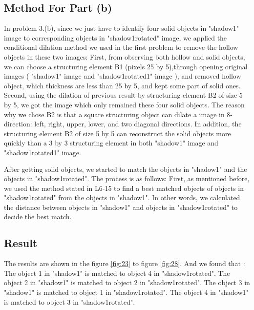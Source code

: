 \documentclass[paper=a4, fontsize=11pt]{scrartcl}
\begin{document}
\subsection{ Method For Part (b) }


In problem 3.(b), since we just have to identify four solid objects in "shadow1" image to corresponding objects in "shadow1rotated" image, we applied the conditional dilation method we used in the first problem to remove the hollow objects in these two images: 
	First, from observing both hollow and solid objects, we can choose a structuring element B1 (pixels 25 by 5),through opening original images ( "shadow1" image and "shadow1rotated1" image ), and removed hollow object, which thickness are less than 25 by 5, and kept some part of solid ones.
	Second, using the dilation of previous result by structuring element B2 of size 5 by 5, we got the image which only remained these four solid objects. The reason why we chose B2 is that a square structuring object can dilate a image in 8-direction: left, right, upper, lower, and two diagonal directions. In addition, the structuring element B2 of size 5 by 5 can reconstruct the solid objects more quickly than a 3 by 3 structuring element in both "shadow1" image and "shadow1rotated1" image.
	 
	After getting solid objects, we started to match the objects in "shadow1" and the objects in "shadow1rotated". The process is as follows: First, as mentioned before, we used the method stated in L6-15 to find a best matched objects of objects in "shadow1rotated" from the objects in "shadow1". In other words, we calculated the distance between objects in "shadow1" and objects in "shadow1rotated" to decide the best match. 
 	 
\subsection{ Result }

The results are shown in the figure \ref{fig:23} to figure \ref{fig:28}. And we found that : The object 1 in "shadow1" is matched to object 4 in "shadow1rotated".  The object 2 in "shadow1" is matched to object 2 in "shadow1rotated".   The object 3 in "shadow1" is matched to object 1 in "shadow1rotated".  The object  4 in "shadow1" is matched to object 3 in "shadow1rotated". 
\end{document}
